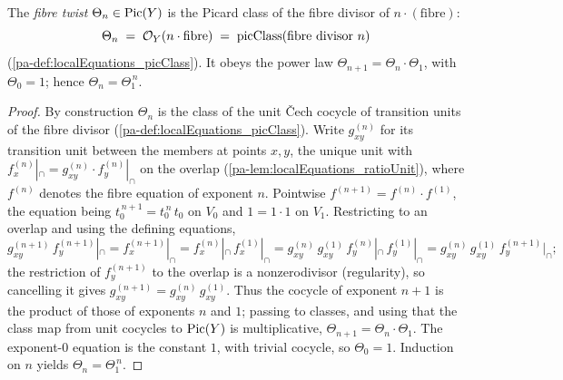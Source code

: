 \begin{definition}
  \label{pa-def:fiberTwist}
  \leanok

  The \emph{fibre twist} \(\Theta_n \in \operatorname{Pic}(Y)\) is the Picard class of the fibre divisor of
  \(n\cdot(\text{fibre})\):
  \[
    \Theta_n \;=\; \mathcal{O}_{Y}(n\cdot\text{fibre}) \;=\; \mathrm{picClass}(\text{fibre divisor } n)
  \]
  (\ref{pa-def:localEquations_picClass}). It obeys the power law \(\Theta_{n+1} = \Theta_n \cdot
  \Theta_1\), with \(\Theta_0 = 1\); hence \(\Theta_n = \Theta_1^{\,n}\).
\end{definition}
\begin{proof}
  \leanok
  By construction \(\Theta_n\) is the class of the unit \v Cech cocycle of transition units of the
  fibre divisor (\ref{pa-def:localEquations_picClass}). Write \(g^{(n)}_{xy}\) for its transition unit
  between the members at points \(x, y\), the unique unit with \(f^{(n)}_x|_{\cap} = g^{(n)}_{xy}
  \cdot f^{(n)}_y|_{\cap}\) on the overlap (\ref{pa-lem:localEquations_ratioUnit}), where \(f^{(n)}\)
  denotes the fibre equation of exponent \(n\). Pointwise \(f^{(n+1)} = f^{(n)} \cdot f^{(1)}\), the
  equation being \(t_0^{\,n+1} = t_0^{\,n}\,t_0\) on \(V_0\) and \(1 = 1\cdot 1\) on \(V_1\).
  Restricting to an overlap and using the defining equations,
  \[
    g^{(n+1)}_{xy}\, f^{(n+1)}_y|_{\cap}
      = f^{(n+1)}_x|_{\cap}
      = f^{(n)}_x|_{\cap}\, f^{(1)}_x|_{\cap}
      = g^{(n)}_{xy}\, g^{(1)}_{xy}\, f^{(n)}_y|_{\cap}\, f^{(1)}_y|_{\cap}
      = g^{(n)}_{xy}\, g^{(1)}_{xy}\, f^{(n+1)}_y|_{\cap};
  \]
  the restriction of \(f^{(n+1)}_y\) to the overlap is a nonzerodivisor (regularity), so cancelling
  it gives \(g^{(n+1)}_{xy} = g^{(n)}_{xy}\, g^{(1)}_{xy}\). Thus the cocycle of exponent \(n+1\) is
  the product of those of exponents \(n\) and \(1\); passing to classes, and using that the class map
  from unit cocycles to \(\operatorname{Pic}(Y)\) is multiplicative, \(\Theta_{n+1} = \Theta_n \cdot \Theta_1\).
  The exponent-\(0\) equation is the constant \(1\), with trivial cocycle, so \(\Theta_0 = 1\).
  Induction on \(n\) yields \(\Theta_n = \Theta_1^{\,n}\).
\end{proof}

